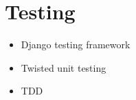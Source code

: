 \chapter{Testing}

\begin{itemize}
    \item Django testing framework
    \item Twisted unit testing
    \item TDD
\end{itemize}
